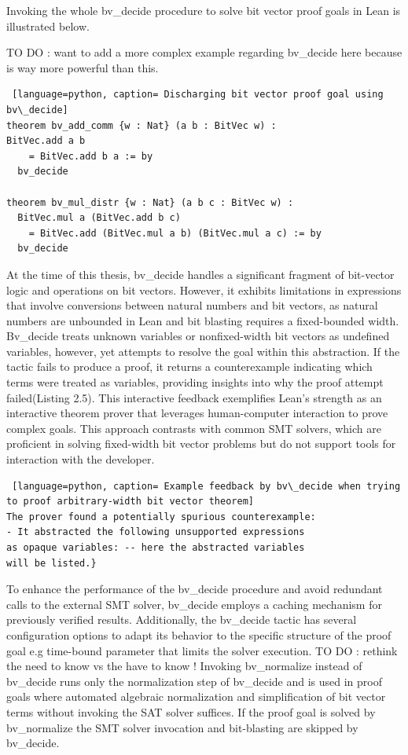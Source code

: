 Invoking the whole bv\_decide procedure to solve bit vector proof goals in Lean is illustrated below.

TO DO : want to add a more complex example regarding bv\_decide here because is way more powerful than this.
\begin{lstlisting} [language=python, caption= Discharging bit vector proof goal using bv\_decide]
theorem bv_add_comm {w : Nat} (a b : BitVec w) : 
BitVec.add a b 
    = BitVec.add b a := by
  bv_decide

theorem bv_mul_distr {w : Nat} (a b c : BitVec w) : 
  BitVec.mul a (BitVec.add b c) 
    = BitVec.add (BitVec.mul a b) (BitVec.mul a c) := by
  bv_decide
\end{lstlisting}

At the time of this thesis, bv\_decide handles a significant fragment of bit-vector logic and operations on bit vectors. However, it exhibits limitations in expressions that involve conversions between natural numbers and bit vectors, as natural numbers are unbounded in Lean and bit blasting requires a fixed-bounded width. Bv\_decide treats unknown variables or nonfixed-width bit vectors as undefined variables, however, yet attempts to resolve the goal within this abstraction. If the tactic fails to produce a proof, it returns a counterexample indicating which terms were treated as variables, providing insights into why the proof attempt failed(Listing 2.5). This interactive feedback exemplifies Lean's strength as an interactive theorem prover that leverages human-computer interaction to prove complex goals. This approach contrasts with common SMT solvers, which are proficient in solving fixed-width bit vector problems but do not support tools for interaction with the developer.


\begin{lstlisting} [language=python, caption= Example feedback by bv\_decide when trying to proof arbitrary-width bit vector theorem]
The prover found a potentially spurious counterexample:
- It abstracted the following unsupported expressions
as opaque variables: -- here the abstracted variables
will be listed.}
\end{lstlisting}





To enhance the performance of the bv\_decide procedure and avoid redundant calls to the external SMT solver, bv\_decide employs a caching mechanism for previously verified results. Additionally, the bv\_decide tactic has several configuration options to adapt its behavior to the specific structure of the proof goal e.g time-bound parameter that limits the solver execution. 
 TO DO : rethink the need to know vs the have to know ! 
Invoking bv\_normalize instead of bv\_decide runs only the normalization step of bv\_decide  and is used in proof goals where automated algebraic normalization and simplification of bit vector terms without invoking the SAT solver suffices. If the proof goal is solved by bv\_normalize the SMT solver invocation and bit-blasting are skipped by bv\_decide. 
